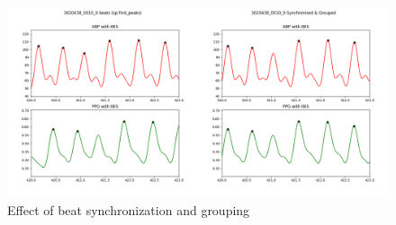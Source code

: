 \begin{figure}[h]
    \begin{minipage}[c]{0.70\textwidth}
        \hspace{-1.5cm}
        \includegraphics[width=1.25\textwidth]{images/methods/synchronised}
    \end{minipage}\hspace{0.65cm}
    \begin{minipage}[c]{0.25\textwidth}
        \captionsetup{format=plain, justification=centering, font=small}
        \caption{Effect of beat synchronization and grouping}
        \label{fig:synchronized}
    \end{minipage}
\end{figure}

